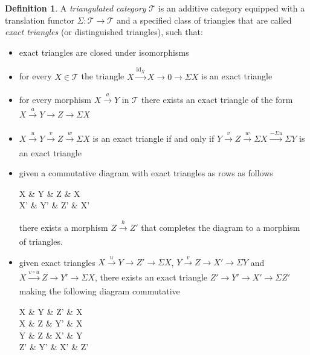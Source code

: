 \documentclass[11pt,reqno,a4paper]{amsart}
\theoremstyle{definition}
\newtheorem{definition}[theorem]{Definition}
\theoremstyle{remark}
\def\dfn#1{{\itshape #1}}
\newcommand{\T}{\mathcal{T}}
\newcommand{\0}{\mathbf{0}}
\renewcommand{\1}{\mathbf{1}}
\def\c{\circ}
\newcommand{\id}[1]{\operatorname{id}_{#1}}
\newcommand{\aar}[2][]{\xrightarrow[#1]{#2}}
\begin{document}
\begin{definition}
    A \dfn{triangulated category} $\T$ is an additive category equipped with a translation functor $\Sigma:\T \to \T$ and a specified class of triangles that are called \dfn{exact triangles} (or distinguished triangles), such that:
\begin{itemize}
\item [(TR0)] exact triangles are closed under isomorphisms
\item[(TR1)] for every $X\in \T$ the triangle
$X \aar{\id{X}} X \aar{}   0  \aar{}  \Sigma X$
is an exact triangle
\item [(TR2)] for every morphism $X \aar{a} Y$ in $\T$ there exists an exact triangle of the form $X \aar{a} Y \aar{}   Z  \aar{}  \Sigma X$
\item [(TR3)]  $X \aar{u} Y \aar{v}   Z  \aar{w}  \Sigma X$ is an exact triangle if and only if  $Y \aar{v}   Z  \aar{w}  \Sigma X \aar{-\Sigma u} \Sigma Y$ is an exact triangle
\item [(TR4)] given a commutative diagram with exact triangles as rows as follows
\begin{cd}
X \arrow[r, "u"] \arrow[d,"f"] \& Y \arrow[r, "v"] \arrow[d,"g"]\& Z  \arrow[r, "w"] \&  \Sigma X \arrow[d,"\Sigma f"]\\[-3ex]
X' \arrow[r, "u'"] \& Y' \arrow[r, "v'"]  \& Z'  \arrow[r, "w'"] \&  \Sigma X'
\end{cd}
  there exists a morphism $Z \aar{h} Z'$ that completes the diagram to a morphism of triangles.
\item [(TR5)] given exact triangles $X \aar{u} Y \aar{} Z' \aar{} \Sigma X$, $Y \aar{v} Z \aar{}   X'  \aar{}  \Sigma Y$ and $X \aar{v \c u} Z \aar{}   Y'  \aar{}  \Sigma X$, there exists an exact triangle $Z' \aar{} Y' \aar{}   X' \aar{}  \Sigma Z'$ making the following diagram commutative
\begin{cd}
X \& Y \& {Z'} \& {\Sigma X} \\
	X \& Z \& {Y'} \& {\Sigma X} \\
	Y \& Z \& {X'} \& {\Sigma Y} \\
	{Z'} \& {Y'} \& {X'} \& {\Sigma Z'}
	\arrow["u", from=1-1, to=1-2]
	\arrow[equals, from=1-1, to=2-1]
	\arrow[from=1-2, to=1-3]
	\arrow["v", from=1-2, to=2-2]
	\arrow[from=1-3, to=1-4]
	\arrow[dashed, from=1-3, to=2-3]
	\arrow[equals, from=1-4, to=2-4]
	\arrow["{v \circ u}"', from=2-1, to=2-2]
	\arrow["u"', from=2-1, to=3-1]
	\arrow[from=2-2, to=2-3]
	\arrow[equals, from=2-2, to=3-2]
	\arrow[from=2-3, to=2-4]
	\arrow[dashed, from=2-3, to=3-3]
	\arrow["{\Sigma u}", from=2-4, to=3-4]
	\arrow["v"', from=3-1, to=3-2]
	\arrow[from=3-1, to=4-1]
	\arrow[from=3-2, to=3-3]
	\arrow[from=3-2, to=4-2]
	\arrow[from=3-3, to=3-4]
	\arrow[equals, from=3-3, to=4-3]
	\arrow[from=3-4, to=4-4]
	\arrow[dashed, from=4-1, to=4-2]
	\arrow[dashed, from=4-2, to=4-3]
	\arrow[dashed, from=4-3, to=4-4]
\end{cd}

\end{itemize}
\end{definition}
\end{document}
